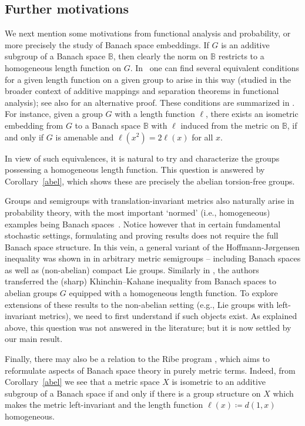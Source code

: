 \documentclass[11pt,a4paper,reqno]{amsart}
\numberwithin{equation}{section}
\theoremstyle{plain}
\theoremstyle{definition}
\newcommand\normsymb{\ell}  %
\newcommand\norm[1]{\ell({#1})}   %
\begin{document}
\subsection{Further motivations}

We next mention some motivations from functional analysis and
probability, or more precisely the study of Banach space embeddings.
If $G$ is an additive subgroup of a Banach space $\mathbb{B}$, then
clearly the norm on $\mathbb{B}$ restricts to a homogeneous length
function on $G$. In~\cite{CSC,GK} one can find several equivalent
conditions for a given length function on a given group to arise in this
way (studied in the broader context of additive mappings and separation
theorems in functional analysis); see also \cite[Theorem 2.10(II)]{Niem}
for an alternative proof. These conditions are summarized in \cite{KR2}.
For instance, given a group $G$ with a length function $\ell$, there
exists an isometric embedding from $G$ to a Banach space $\mathbb{B}$
with $\normsymb$ induced from the metric on $\mathbb{B}$, if and only if
$G$ is amenable and $\norm{x^2} = 2 \norm{x}$ for all $x$.

In view of such equivalences, it is natural to try and characterize the
groups possessing a homogeneous length function. This question is
answered by Corollary~\ref{abel}, which shows these are precisely the
abelian torsion-free groups.

Groups and semigroups with translation-invariant metrics also naturally
arise in probability theory, with the most important `normed' (i.e.,
homogeneous) examples being Banach spaces~\cite{LT}. Notice however that
in certain fundamental stochastic settings, formulating and proving
results does not require the full Banach space structure. In this vein, a
general variant of the Hoffmann-J{\o}rgensen inequality was shown in
\cite{KR1} in arbitrary metric semigroups -- including Banach spaces as
well as (non-abelian) compact Lie groups. Similarly in \cite{KR2}, the
authors transferred the (sharp) Khinchin--Kahane inequality from Banach
spaces to abelian groups $G$ equipped with a homogeneous length function.
To explore extensions of these results to the non-abelian setting (e.g.,
Lie groups with left-invariant metrics), we need to first understand if
such objects exist. As explained above, this question was not answered in
the literature; but it is now settled by our main result.

Finally, there may also be a relation to the Ribe program \cite{Naor},
which aims to reformulate aspects of Banach space theory in purely metric
terms. Indeed, from Corollary~\ref{abel} we see that a metric space $X$
is isometric to an additive subgroup of a Banach space if and only if
there is a group structure on $X$ which makes the metric left-invariant
and the length function $\norm{ x } \coloneqq d(1,x)$ homogeneous.
\end{document}
